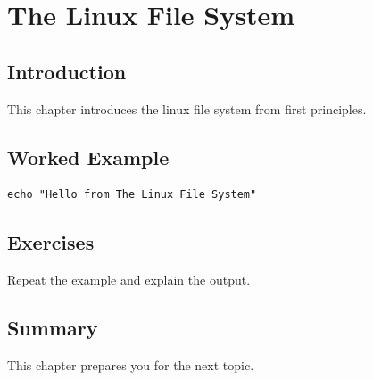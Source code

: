 \chapter{The Linux File System}
\label{chap:33}
\section{Introduction}
This chapter introduces the linux file system from first principles.

\section{Worked Example}
\begin{lstlisting}
echo "Hello from The Linux File System"
\end{lstlisting}

\section{Exercises}
\begin{exercise}
Repeat the example and explain the output.
\end{exercise}

\section{Summary}
This chapter prepares you for the next topic.
